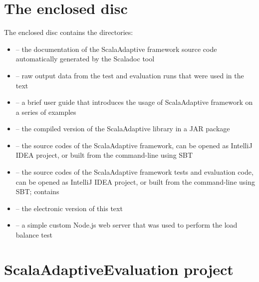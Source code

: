 \documentclass[12pt,a4paper]{report}
\begin{document}
\label{attachments}
\renewcommand{\thesection}{\Alph{section}}

\section{The enclosed disc}
\label{attach:cd}

The enclosed disc contains the directories:

\begin{itemize}
	\item {} -- the documentation of the ScalaAdaptive framework source code automatically generated by the Scaladoc tool
	\item {} -- raw output data from the test and evaluation runs that were used in the text
	\item {} -- a brief user guide that introduces the usage of ScalaAdaptive framework on a series of examples
	\item {} -- the compiled version of the ScalaAdaptive library in a JAR package
\item {} -- the source codes of the ScalaAdaptive framework, can be opened as IntelliJ IDEA project, or built from the command-line using SBT
\item {} -- the source codes of the ScalaAdaptive framework tests and evaluation code, can be opened as IntelliJ IDEA project, or built from the command-line using SBT; contains 
	\item {} -- the electronic version of this text
	\item {} -- a simple custom Node.js web server that was used to perform the load balance test
\end{itemize}

\section{ScalaAdaptiveEvaluation project}
\label{attach:eval_project}
\end{document}
